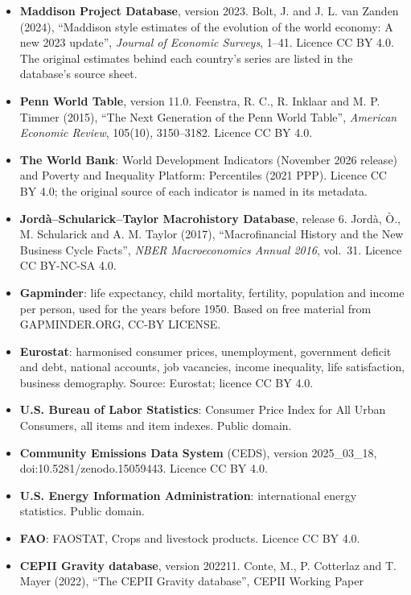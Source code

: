 \begin{itemize}\small
\item \textbf{Maddison Project Database}, version 2023. Bolt, J. and J. L. van
  Zanden (2024), ``Maddison style estimates of the evolution of the world
  economy: A new 2023 update'', \textit{Journal of Economic Surveys}, 1--41.
  Licence CC BY 4.0. The original estimates behind each country's series are
  listed in the database's source sheet.
\item \textbf{Penn World Table}, version 11.0. Feenstra, R. C., R. Inklaar and
  M. P. Timmer (2015), ``The Next Generation of the Penn World Table'',
  \textit{American Economic Review}, 105(10), 3150--3182. Licence CC BY 4.0.
\item \textbf{The World Bank}: World Development Indicators (November 2026
  release) and Poverty and Inequality Platform: Percentiles (2021 PPP). Licence
  CC BY 4.0; the original source of each indicator is named in its metadata.
\item \textbf{Jord\`a--Schularick--Taylor Macrohistory Database}, release 6.
  Jord\`a, \`O., M. Schularick and A. M. Taylor (2017), ``Macrofinancial History
  and the New Business Cycle Facts'', \textit{NBER Macroeconomics Annual 2016},
  vol.~31. Licence CC BY-NC-SA 4.0.
\item \textbf{Gapminder}: life expectancy, child mortality, fertility,
  population and income per person, used for the years before 1950. Based on
  free material from GAPMINDER.ORG, CC-BY LICENSE.
\item \textbf{Eurostat}: harmonised consumer prices, unemployment, government
  deficit and debt, national accounts, job vacancies, income inequality, life
  satisfaction, business demography. Source: Eurostat; licence CC BY 4.0.
\item \textbf{U.S. Bureau of Labor Statistics}: Consumer Price Index for All
  Urban Consumers, all items and item indexes. Public domain.
\item \textbf{Community Emissions Data System} (CEDS), version 2025\_03\_18,
  doi:10.5281/zenodo.15059443. Licence CC BY 4.0.
\item \textbf{U.S. Energy Information Administration}: international energy
  statistics. Public domain.
\item \textbf{FAO}: FAOSTAT, Crops and livestock products. Licence CC BY 4.0.
\item \textbf{CEPII Gravity database}, version 202211. Conte, M., P. Cotterlaz
  and T. Mayer (2022), ``The CEPII Gravity database'', CEPII Working Paper

\end{itemize}
